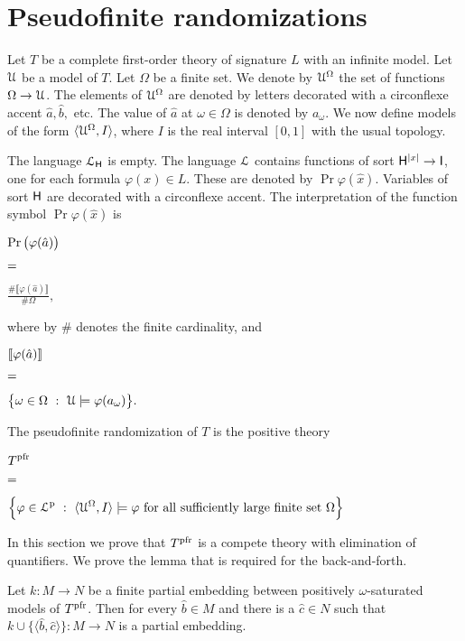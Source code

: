 \documentclass[10pt,oneside]{amsproc}
\begin{document}
{%
\section{Pseudofinite randomizations}

\def\ceq#1#2#3{\parbox[t]{25ex}{$\displaystyle #1$}\parbox[t]{6ex}{$\displaystyle\hfil #2$}{$\displaystyle #3$}}

Let $T$ be a complete first-order theory of signature $L$ with an infinite model.
Let ${\EuScript U}$ be a model of $T$.
Let $\Omega$ be a finite set.
We denote by ${\EuScript U}^\Omega$ the set of functions $\Omega\to{\EuScript U}$.
The elements of ${\EuScript U}^\Omega$ are denoted by letters decorated with a circonflexe accent $\hat a,\hat b,$ etc.
The value of $\hat a$ at $\omega\in\Omega$ is denoted by $a_\omega$.
We now define models of the form $\langle{\EuScript U}^\Omega, I\rangle$, where $I$ is the real interval $[0,1]$ with the usual topology.

The language ${\EuScript L}_{\sf H}$ is empty.
The language ${\EuScript L}$ contains functions of sort ${\sf H}^{|x|}\to{\sf I}$, one for each formula $\varphi(x)\in L$.
These are denoted by $\Pr\varphi(\hat x)$. 
Variables of sort ${\sf H}$ are decorated with a circonflexe accent.
The interpretation of the function symbol $\Pr\varphi(\hat x)$ is 

\ceq{\hfill\Pr\big(\varphi(\hat a)\big)}
{=}
{\frac{\#\llbracket\varphi(\hat a)\rrbracket}{\#\Omega},}

where by $\#$ denotes the finite cardinality, and

\ceq{\hfill\llbracket\varphi(\hat a)\rrbracket}{=}{\big\{\omega\in\Omega\ :\ {\EuScript U}\models\varphi(a_\omega)\big\}.}

The pseudofinite randomization of $T$ is the positive theory

\ceq{\hfill T^{\rm pfr}}
{=}
{\Big\{\varphi\in{\EuScript L}^{\rm p}\ :\ \langle{\EuScript U}^\Omega, I\rangle\models\varphi\textrm{ for all sufficiently large finite set }\Omega\Big\}}

In this section we prove that $T^{\rm pfr}$ is a compete theory with elimination of quantifiers.
We prove the lemma that is required for the back-and-forth.

\begin{lemma}
  Let $k:M\to N$ be a finite partial embedding between positively $\omega$-saturated models of $T^{\rm pfr}$.
  Then for every $\hat b\in M$ and there is a $\hat c\in N$ such that $k\cup\{\langle\hat b,\hat c\rangle\}:M\to N$ is a partial embedding.
\end{lemma}

}
\end{document}
